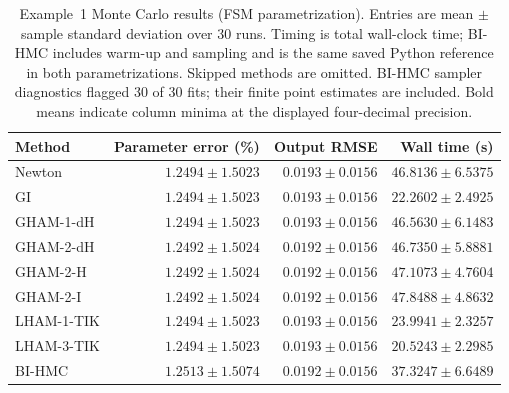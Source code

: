 \begin{table}[tbp]
\centering
\small
\setlength{\tabcolsep}{4pt}
\caption{Example~1 Monte Carlo results (FSM parametrization). Entries are mean $\pm$ sample standard deviation over 30 runs. Timing is total wall-clock time; BI-HMC includes warm-up and sampling and is the same saved Python reference in both parametrizations. Skipped methods are omitted. BI-HMC sampler diagnostics flagged 30 of 30 fits; their finite point estimates are included. Bold means indicate column minima at the displayed four-decimal precision.}
\label{tab:example-1-montecarlo-fsm}
\begin{tabular}{lrrr}
\toprule
Method & Parameter error (\%) & Output RMSE & Wall time (s) \\
\midrule
Newton & $1.2494 \pm 1.5023$ & $0.0193 \pm 0.0156$ & $46.8136 \pm 6.5375$ \\
GI & $1.2494 \pm 1.5023$ & $0.0193 \pm 0.0156$ & $22.2602 \pm 2.4925$ \\
GHAM-1-dH & $1.2494 \pm 1.5023$ & $0.0193 \pm 0.0156$ & $46.5630 \pm 6.1483$ \\
GHAM-2-dH & $\mathbf{1.2492} \pm 1.5024$ & $\mathbf{0.0192} \pm 0.0156$ & $46.7350 \pm 5.8881$ \\
GHAM-2-H & $\mathbf{1.2492} \pm 1.5024$ & $\mathbf{0.0192} \pm 0.0156$ & $47.1073 \pm 4.7604$ \\
GHAM-2-I & $\mathbf{1.2492} \pm 1.5024$ & $\mathbf{0.0192} \pm 0.0156$ & $47.8488 \pm 4.8632$ \\
LHAM-1-TIK & $1.2494 \pm 1.5023$ & $0.0193 \pm 0.0156$ & $23.9941 \pm 2.3257$ \\
LHAM-3-TIK & $1.2494 \pm 1.5023$ & $0.0193 \pm 0.0156$ & $\mathbf{20.5243} \pm 2.2985$ \\
BI-HMC & $1.2513 \pm 1.5074$ & $\mathbf{0.0192} \pm 0.0156$ & $37.3247 \pm 6.6489$ \\
\bottomrule
\end{tabular}
\end{table}
